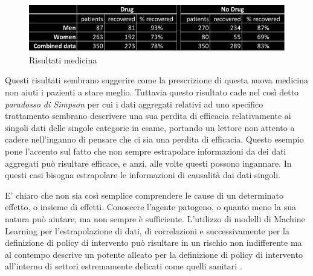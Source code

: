 \begin{figure}[h]
    \begin{center}
        \includegraphics[width=\linewidth]{img/simpson.png}
        \caption{Risultati medicina}
        \label{fig:simpson_paradox}
    \end{center}
\end{figure}

Questi risultati sembrano suggerire come la prescrizione 
di questa nuova medicina non aiuti i pazienti a stare meglio.
Tuttavia questo risultato cade nel così detto \emph{paradosso di Simpson}
\cite{wiki:Simpson's_paradox} per cui i dati aggregati relativi 
ad uno specifico trattamento sembrano descrivere una sua 
perdita di efficacia relativamente ai singoli dati delle 
singole categorie in esame, portando un lettore non attento 
a cadere nell'inganno di pensare che ci sia una perdita di 
efficacia. Questo esempio pone l'accento sul fatto che non sempre
estrapolare informazioni da dei dati aggregati può risultare
efficace, e anzi, alle volte questi possono ingannare.
In questi casi bisogna estrapolare le informazioni di 
causalità dai dati singoli.

E' chiaro che non sia così semplice comprendere le cause 
di un determinato effetto, o insieme di effetti. Conoscere
l'agente patogeno, o quanto meno la sua natura può aiutare,
ma non sempre è sufficiente. L'utilizzo di modelli di 
Machine Learning per l'estrapolazione di dati, di correlazioni
e successivamente per la definizione di policy di intervento
può risultare in un rischio non indifferente ma al contempo 
descrive un potente alleato per la definizione di policy di 
intervento all'interno di settori estremamente delicati come 
quelli sanitari \cite{doi:10.1098/rsos.220638}.